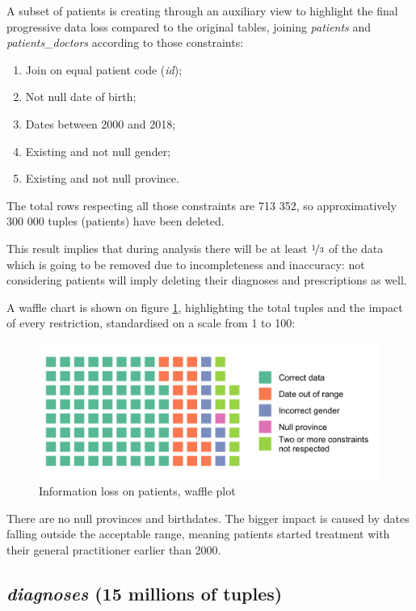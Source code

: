 A subset of patients is creating through an auxiliary view to highlight the final progressive data loss compared to the original tables, joining \textit{patients} and \textit{patients\_doctors} according to those constraints:
\begin{enumerate}
	\item Join on equal patient code (\textit{id});
	\item Not null date of birth;
	\item Dates between 2000 and 2018;
	\item Existing and not null gender;
	\item Existing and not null province.
\end{enumerate}

The total rows respecting all those constraints are 713 352, so approximatively 300 000 tuples (patients) have been deleted. 

This result implies that during analysis there will be at least $\nicefrac{1}{3}$ of the data which is going to be removed due to incompleteness and inaccuracy: not considering patients will imply deleting their diagnoses and prescriptions as well.

A waffle chart is shown on figure \ref{waffle}, highlighting the total tuples and the impact of every restriction, standardised on a scale from 1 to 100:
\begin{figure}[h]
	\centering
	\includegraphics[scale=0.45]{../plots/patients-waffle.png}
	\caption{\small Information loss on patients, waffle plot}
	\label{waffle}
\end{figure}

There are no null provinces and birthdates. The bigger impact is caused by dates falling outside the acceptable range, meaning patients started treatment with their general practitioner earlier than 2000.

\subsection{\textit{diagnoses} (15 millions of tuples)}
